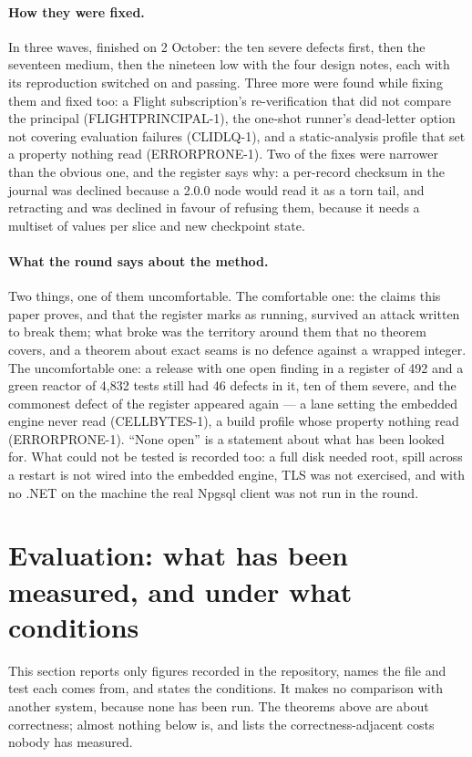 \documentclass[11pt,a4paper]{article}
\renewcommand{\_}{\oldunderscore\allowbreak}
\newcommand{\code}[1]{\texttt{\pvbreakable{#1}}}
\begin{document}
\paragraph{How they were fixed.} In three waves, finished on 2 October: the ten severe defects first,
then the seventeen medium, then the nineteen low with the four design notes, each with its reproduction
switched on and passing. Three more were found while fixing them and fixed too: a Flight subscription's
re-verification that did not compare the principal (FLIGHTPRINCIPAL-1), the one-shot runner's dead-letter
option not covering evaluation failures (CLIDLQ-1), and a static-analysis profile that set a property
nothing read (ERRORPRONE-1). Two of the fixes were narrower than the obvious one, and the register says
why: a per-record checksum in the journal was declined because a 2.0.0 node would read it as a torn tail,
and retracting \code{MIN} and \code{MAX} was declined in favour of refusing them, because it needs a
multiset of values per slice and new checkpoint state.

\paragraph{What the round says about the method.} Two things, one of them uncomfortable. The comfortable
one: the claims this paper proves, and that the register marks as running, survived an attack written to
break them; what broke was the territory around them that no theorem covers, and a theorem about exact
seams is no defence against a wrapped integer. The uncomfortable one: a release with one open finding in a
register of 492 and a green reactor of 4{,}832 tests still had 46 defects in it, ten of them severe,
and the commonest defect of the register appeared again --- a lane setting the embedded engine never read
(CELLBYTES-1), a build profile whose property nothing read (ERRORPRONE-1). ``None open'' is a statement about
what has been looked for. What could not be tested is recorded too: a full disk needed root, spill across a
restart is not wired into the embedded engine, TLS was not exercised, and with no .NET on the machine the
real Npgsql client was not run in the round.

\section{Evaluation: what has been measured, and under what conditions}\label{sec:evaluation}

This section reports only figures recorded in the repository, names the file and test each comes from,
and states the conditions. It makes no comparison with another system, because none has been run. The
theorems above are about correctness; almost nothing below is, and  lists the
correctness-adjacent costs nobody has measured.
\end{document}

